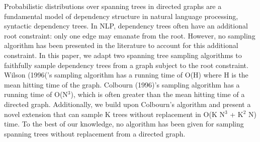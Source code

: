 Probabilistic distributions over spanning trees in directed graphs are a fundamental model of dependency structure in natural language processing, syntactic dependency trees. In NLP, dependency trees often have an additional root constraint: only one edge may emanate from the root. However, no sampling algorithm has been presented in the literature to account for this additional constraint. In this paper, we adapt two spanning tree sampling algorithms to faithfully sample dependency trees from a graph subject to the root constraint. Wilson (1996('s sampling algorithm has a running time of O(H) where H is the mean hitting time of the graph. Colbourn (1996)'s sampling algorithm has a running time of O(N$^3$), which is often greater than the mean hitting time of a directed graph. Additionally, we build upon Colbourn's algorithm and present a novel extension that can sample K trees without replacement in O(K N$^3$ + K$^2$ N) time. To the best of our knowledge, no algorithm has been given for sampling spanning trees without replacement from a directed graph.

